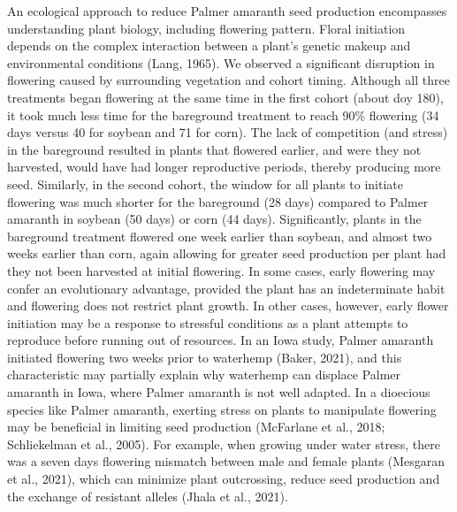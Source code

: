 \documentclass[utf8]{frontiersSCNS}
\begin{document}
An ecological approach to reduce Palmer amaranth seed production
encompasses understanding plant biology, including flowering pattern.
Floral initiation depends on the complex interaction between a plant's
genetic makeup and environmental conditions (Lang, 1965). We observed a
significant disruption in flowering caused by surrounding vegetation and
cohort timing. Although all three treatments began flowering at the same
time in the first cohort (about doy 180), it took much less time for the
bareground treatment to reach 90\% flowering (34 days versus 40 for
soybean and 71 for corn). The lack of competition (and stress) in the
bareground resulted in plants that flowered earlier, and were they not
harvested, would have had longer reproductive periods, thereby producing
more seed. Similarly, in the second cohort, the window for all plants to
initiate flowering was much shorter for the bareground (28 days)
compared to Palmer amaranth in soybean (50 days) or corn (44 days).
Significantly, plants in the bareground treatment flowered one week
earlier than soybean, and almost two weeks earlier than corn, again
allowing for greater seed production per plant had they not been
harvested at initial flowering. In some cases, early flowering may
confer an evolutionary advantage, provided the plant has an
indeterminate habit and flowering does not restrict plant growth. In
other cases, however, early flower initiation may be a response to
stressful conditions as a plant attempts to reproduce before running out
of resources. In an Iowa study, Palmer amaranth initiated flowering two
weeks prior to waterhemp (Baker, 2021), and this characteristic may
partially explain why waterhemp can displace Palmer amaranth in Iowa,
where Palmer amaranth is not well adapted. In a dioecious species like
Palmer amaranth, exerting stress on plants to manipulate flowering may
be beneficial in limiting seed production (McFarlane et al., 2018;
Schliekelman et al., 2005). For example, when growing under water
stress, there was a seven days flowering mismatch between male and
female plants (Mesgaran et al., 2021), which can minimize plant
outcrossing, reduce seed production and the exchange of resistant
alleles (Jhala et al., 2021).
\end{document}
